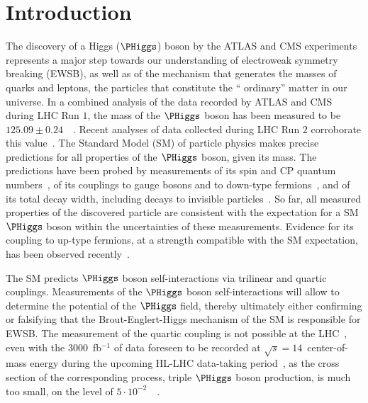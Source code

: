 \section{Introduction}
\label{sec:introduction}

The discovery of a Higgs ($\PHiggs$) boson by the ATLAS and CMS experiments~\cite{Higgs-Discovery_ATLAS,Higgs-Discovery_CMS}
represents a major step towards our understanding of electroweak symmetry breaking (EWSB),
as well as of the mechanism that generates the masses of quarks and leptons, 
the particles that constitute the `` ordinary'' matter in our universe.
In a combined analysis of the data recorded by ATLAS and CMS during LHC Run $1$, 
the mass of the $\PHiggs$ boson has been measured to be $125.09 \pm 0.24$~\GeV~\cite{HIG-14-042}.
Recent analyses of data collected during LHC Run $2$ corroborate this value~\cite{ATLAS:2020coj,CMS:2020xrn}.
The Standard Model (SM) of particle physics makes precise predictions for all properties of the $\PHiggs$ boson, given its mass. 
The predictions have been probed by measurements of its spin and CP quantum numbers~\cite{HIG-14-018,Aad:2015mxa,ATLAS:2020evk},
of its couplings to gauge bosons and to down-type fermions~\cite{HIG-15-002},
and of its total decay width, including decays to invisible particles~\cite{CMS:2018yfx,CMS:2019ekd,Aad:2015pla}.
So far, all measured properties of the discovered particle are consistent with the expectation for a SM $\PHiggs$ boson 
within the uncertainties of these measurements.
Evidence for its coupling to up-type fermions, at a strength compatible with the SM expectation, has been observed recently~\cite{Aaboud:2018urx,HIG-17-035}.

The SM predicts $\PHiggs$ boson self-interactions via trilinear and quartic couplings. 
Measurements of the $\PHiggs$ boson self-interactions will allow to determine the potential of the $\PHiggs$ field,
thereby ultimately either confirming or falsifying that the Brout-Englert-Higgs mechanism of the SM is responsible for EWSB.
The measurement of the quartic coupling is not possible at the LHC~\cite{deFlorian:2019app}, 
even with the $3000$~fb$^{-1}$ of data foreseen to be recorded at $\sqrt{s}=14$~\TeV center-of-mass energy during the upcoming HL-LHC data-taking period~\cite{HL-LHC-TDR},
as the cross section of the corresponding process, triple $\PHiggs$ boson production, is much too small, 
on the level of $5 \cdot 10^{-2}$~\fb~\cite{Plehn:2005nk,Binoth:2006ym}.


